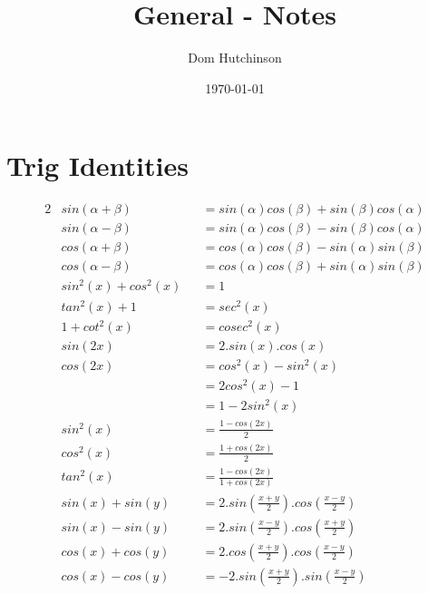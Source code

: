 \documentclass[11pt,a4paper]{article}
\begin{document}
\pagestyle{fancy}
\setlength\parindent{0pt}
\allowdisplaybreaks

\renewcommand{\headrulewidth}{0pt}
\newcommand{\vect}[1]{\boldsymbol{#1}}
\newcommand{\subtitle}[2]{\textbf{#1}\textit{#2} \\}
\newcommand{\dotprod}[0]{\boldsymbol{\cdot}}

\title{General - Notes}
\author{Dom Hutchinson}
\date{\today}
\maketitle

\fancyhead[R]{\today}

\section{Trig Identities}
\begin{alignat*}{2}
  &sin(\alpha + \beta) &&= sin(\alpha)cos(\beta) + sin(\beta)cos(\alpha) \\
  &sin(\alpha - \beta) &&= sin(\alpha)cos(\beta) - sin(\beta)cos(\alpha) \\
  &cos(\alpha + \beta) &&= cos(\alpha)cos(\beta) - sin(\alpha)sin(\beta) \\
  &cos(\alpha - \beta) &&= cos(\alpha)cos(\beta) + sin(\alpha)sin(\beta) \\
  &sin^2(x) + cos^2(x) &&= 1 \\
  &tan^2(x) + 1 &&= sec^2(x) \\
  &1 + cot^2(x) &&= cosec^2(x) \\
  &sin(2x) &&= 2.sin(x).cos(x) \\
  &cos(2x) &&= cos^2(x) - sin^2(x)\\
  & &&= 2cos^2(x) - 1 \\
  & &&= 1 - 2sin^2(x) \\
  &sin^2(x) &&= \frac{1 - cos(2x)}{2} \\
  &cos^2(x) &&= \frac{1 + cos(2x)}{2} \\
  &tan^2(x) &&= \frac{1-cos(2x)}{1 + cos(2x)} \\
  &sin(x) + sin(y) &&= 2.sin\left(\frac{x+y}{2}\right).cos\left(\frac{x-y}{2}\right) \\
  &sin(x) - sin(y) &&= 2.sin\left(\frac{x-y}{2}\right).cos\left(\frac{x+y}{2}\right) \\
  &cos(x) + cos(y) &&= 2.cos\left(\frac{x+y}{2}\right).cos\left(\frac{x-y}{2}\right) \\
  &cos(x) - cos(y) &&= -2.sin\left(\frac{x+y}{2}\right).sin\left(\frac{x-y}{2}\right)
\end{alignat*}
\end{document}
